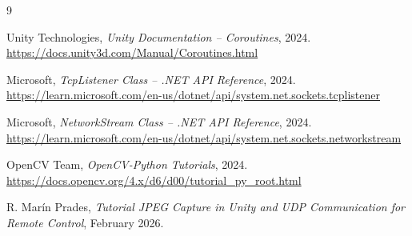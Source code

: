 \documentclass[12pt,a4paper]{article}
\begin{document}
\begin{thebibliography}{9}

Unity Technologies, \textit{Unity Documentation -- Coroutines}, 2024.
\url{https://docs.unity3d.com/Manual/Coroutines.html}

Microsoft, \textit{TcpListener Class -- .NET API Reference}, 2024.
\url{https://learn.microsoft.com/en-us/dotnet/api/system.net.sockets.tcplistener}

Microsoft, \textit{NetworkStream Class -- .NET API Reference}, 2024.
\url{https://learn.microsoft.com/en-us/dotnet/api/system.net.sockets.networkstream}

OpenCV Team, \textit{OpenCV-Python Tutorials}, 2024.
\url{https://docs.opencv.org/4.x/d6/d00/tutorial_py_root.html}

R. Marín Prades, \textit{Tutorial JPEG Capture in Unity and UDP Communication
for Remote Control}, February 2026.

\end{thebibliography}
\end{document}
